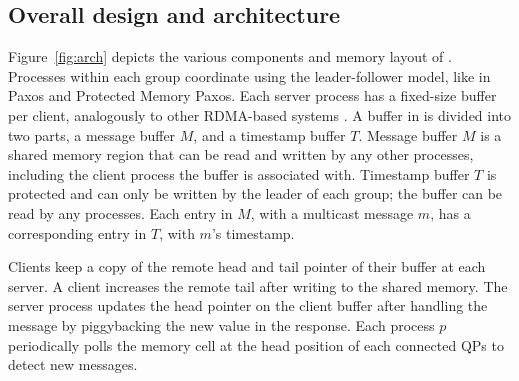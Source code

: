 \subsection{Overall design and architecture}
\label{sec:overview}

Figure~\ref{fig:arch} depicts the various components and memory layout of \libname.
Processes within each group coordinate using the leader-follower model, like in Paxos and Protected Memory Paxos.
Each server process has a fixed-size buffer per client, analogously to other RDMA-based systems \cite{FaRM, Mu, DARE, APUS}.
A buffer in \libname is divided into two parts, a message buffer $M$, and a timestamp buffer $T$.
Message buffer $M$ is a shared memory region that can be read and written by any other processes, including the client process the buffer is associated with.
Timestamp buffer $T$ is protected and can only be written by the leader of each group; the buffer can be read by any processes.
Each entry in $M$, with a multicast message $m$, has a corresponding entry in $T$, with $m$'s timestamp.


Clients keep a copy of the remote head and tail pointer of their buffer at each server. 
A client increases the remote tail after writing to the shared memory. 
The server process updates the head pointer on the client buffer after handling the message by piggybacking the new value in the response.
Each process $p$ periodically polls the memory cell at the head position of each
connected QPs to detect new messages.




